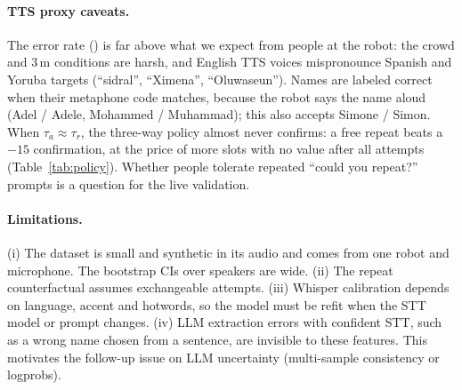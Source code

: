 \documentclass[10pt,a4paper]{article}
\begin{document}
\ifnum{}
\paragraph{TTS proxy caveats.} The error rate (\WTwoErrorRate) is far above what we expect from people at the
robot: the crowd and 3\,m conditions are harsh, and English TTS voices mispronounce Spanish and Yoruba targets
(``sidral'', ``Ximena'', ``Oluwaseun''). Names are labeled correct when their metaphone code matches, because
the robot says the name aloud (Adel / Adele, Mohammed / Muhammad); this also accepts Simone / Simon. When
$\tau_a \approx \tau_r$, the three-way policy almost never confirms: a free repeat beats a $-15$ confirmation,
at the price of more slots with no value after all attempts (Table~\ref{tab:policy}). Whether people tolerate
repeated ``could you repeat?'' prompts is a question for the live validation.
\fi

\paragraph{Limitations.} (i) The dataset is small\ifnum{} and synthetic in its audio\else{} and comes
from one robot and microphone\fi. The bootstrap CIs over speakers are wide. (ii) The repeat counterfactual assumes exchangeable attempts. (iii) Whisper
calibration depends on language, accent and hotwords, so the model must be refit when the STT model or
prompt changes. (iv) LLM extraction errors with confident STT, such as a wrong name chosen from a sentence,
are invisible to these features. This motivates the follow-up issue on LLM uncertainty (multi-sample
consistency or logprobs).

\end{document}
